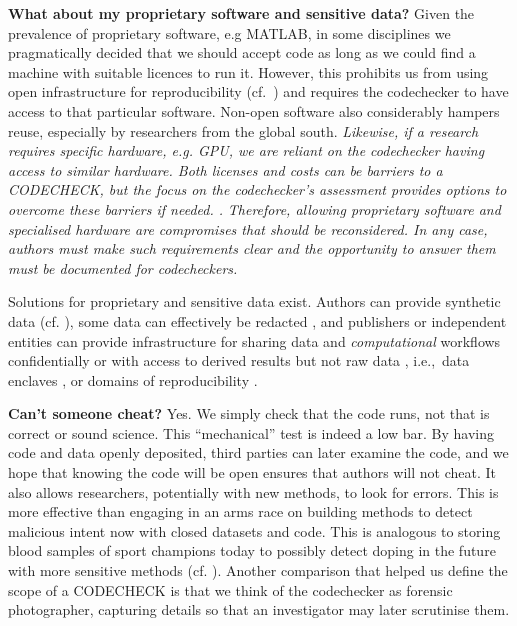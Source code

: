 \documentclass[12pt]{article}
\newcommand{\rev}[1]{\textit{#1}}
\begin{document}
\textbf{What about my proprietary software and sensitive data?}  Given
the prevalence of proprietary software, e.g MATLAB, in some disciplines
we pragmatically
decided that we should accept code as long as we could find a machine
with suitable licences to run it.  However, this prohibits us from
using open infrastructure for reproducibility
(cf.~\cite{konkol_publishing_2020,perkel_make_2019}) and requires the
codechecker to have access to that particular software.  Non-open
software also considerably hampers reuse, especially by researchers
from the global south.  \rev{Likewise, if a research
requires specific hardware, e.g. GPU, we are reliant on the
codechecker having access to similar hardware. Both licenses and costs
can be barriers to a CODECHECK, but the focus on the codechecker's
assessment provides options to overcome these barriers if needed.
.}  \rev{Therefore, allowing proprietary software and
specialised hardware are compromises that should be reconsidered.
In any case, authors must make such requirements clear and the 
opportunity to answer them must be documented for codecheckers.}

Solutions for proprietary and sensitive data exist.  Authors can
provide synthetic data (cf. \cite{shannon_opening_2018}), some data
can effectively be redacted \cite{oloughlin_data_2015}, and publishers
or independent entities can provide infrastructure for sharing data
and \rev{computational} workflows confidentially \cite{perignon_certify_2019} or with
access to derived results but not raw data
\cite{shannon_opening_2018}, i.e.,~data enclaves
\cite{foster_research_2018}, or domains of reproducibility
\cite{harris_more_2017}.

\textbf{Can't someone cheat?} Yes. We simply check that the code runs,
not that is correct or sound science. This ``mechanical'' test is
indeed a low bar.  By having code and data openly deposited, third
parties can later examine the code, and we hope that knowing the code
will be open ensures that authors will not cheat.  It also allows
researchers, potentially with new methods, to look for errors.  This
is more effective than engaging in an arms race on building methods to
detect malicious intent now with closed datasets and code.  This is
analogous to storing blood samples of sport champions today to
possibly detect doping in the future with more sensitive methods
(cf. \cite{everythinghertz97}).  Another comparison that helped us
define the scope of a CODECHECK is that we think of the codechecker as
forensic photographer, capturing details so that an investigator may
later scrutinise them.
\end{document}
